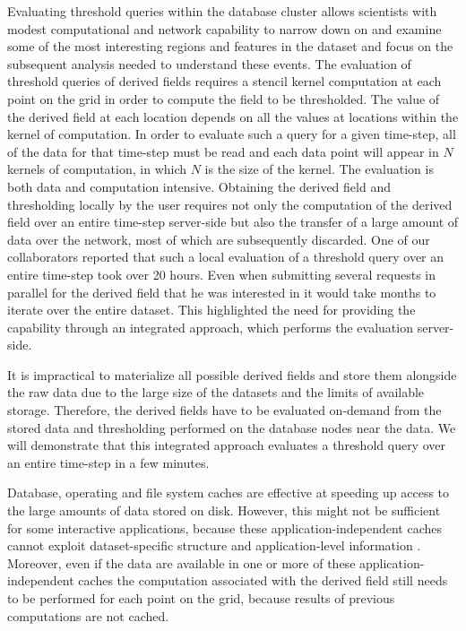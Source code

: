 \documentclass{sig-alternate}
\begin{document}
Evaluating threshold queries within the database cluster allows scientists with modest computational and network capability to narrow down on and
examine some of the most interesting regions and features in the dataset and focus on the subsequent analysis needed to understand these events.
The evaluation of threshold queries of derived fields requires a stencil kernel computation at each point on the grid in order to compute the field to be thresholded.
The value of the derived field at each location depends on all the values at locations within the kernel of computation. 
In order to evaluate such a query for a given time-step, all of the data for that time-step must be read and each data point 
will appear in $N$ kernels of computation, in which $N$ is the size of the kernel. The evaluation is both data and computation intensive.
Obtaining the derived field and thresholding locally by the user requires not only the computation of the derived field over an entire time-step server-side 
but also the transfer of a large amount of data over the network, most of which are subsequently discarded. 
One of our collaborators reported that such a local evaluation of a threshold
query over an entire time-step took over 20 hours. Even when submitting several requests in parallel for the derived field that he was interested in it
would take months to iterate over the entire dataset. This highlighted the need for providing the capability through an integrated approach,
which performs the evaluation server-side.

It is impractical to materialize all possible derived fields and store them alongside the raw data
due to the large size of the datasets and the limits of available storage. Therefore, the derived fields 
have to be evaluated on-demand from the stored data and thresholding performed on the database nodes near the data.
We will demonstrate that this integrated approach evaluates a threshold query over an entire time-step in a few minutes.

Database, operating and file system caches are effective at speeding up access to the large amounts of data stored on disk. However, this might not be
sufficient for some interactive applications, because these application-independent caches cannot exploit dataset-specific structure and application-level
information \cite{Lopez}. Moreover, even if the data are available in one or more of these application-independent caches the computation associated 
with the derived field still needs to be performed for each point on the grid, because results of previous computations are not cached. 
\end{document}
